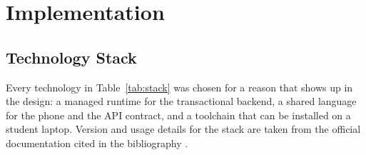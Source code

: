 \chapter{Implementation}

\section{Technology Stack}

Every technology in Table~\ref{tab:stack} was chosen for a reason that shows up in
the design: a managed runtime for the transactional backend, a shared language for
the phone and the API contract, and a toolchain that can be installed on a student
laptop. Version and usage details for the stack are taken from the official
documentation cited in the bibliography
\cite{springboot,springsecurity,postgres,expo,bleplx,esp32core,arduinojson,esp32servo,compose,jacoco,junit,mockito,jjwt}.

